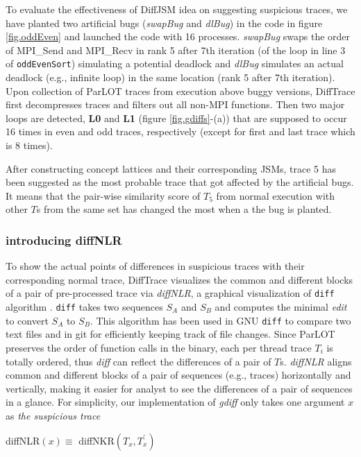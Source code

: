 To evaluate the effectiveness of DiffJSM idea on suggesting suspicious traces, we have planted two artificial bugs (\textit{swapBug} and \textit{dlBug}) in the code in figure \ref{fig.oddEven} and launched the code with 16 processes. 
%
\textit{swapBug} swaps the order of MPI\_Send and MPI\_Recv in rank 5 after 7th iteration (of the loop in line 3 of \texttt{oddEvenSort}) simulating a potential deadlock and \textit{dlBug} simulates an actual deadlock (e.g., infinite loop) in the same location (rank 5 after 7th iteration).
%
Upon collection of ParLOT traces from execution above buggy versions, DiffTrace first decompresses traces and filters out all non-MPI functions.
Then two major loops are detected, \textbf{L0} and \textbf{L1}  (figure \ref{fig.gdiffs}-(a)) that are supposed to occur 16 times in even and odd traces, respectively (except for first and last trace which is 8 times).

After constructing concept lattices and their corresponding JSMs, trace 5 has been suggested as the most probable trace that got affected by the artificial bugs. It means that the pair-wise similarity score of $T_5$ from normal execution with other $T$s from the same set has changed the most when a the bug is planted. 

\subsubsection{introducing diffNLR}
To show the actual points of differences in suspicious traces with their corresponding normal trace, DiffTrace visualizes the common and different blocks of a pair of pre-processed trace via \textit{diffNLR}, a graphical visualization of \texttt{diff} algorithm \cite{diff-myers}.
%
\texttt{diff} takes two sequences $S_A$ and $S_B$ and computes the minimal \textit{edit} to convert $S_A$ to $S_B$. This algorithm has been used in GNU \texttt{diff} to compare two text files and in git for efficiently keeping track of file changes.
Since ParLOT preserves the order of function calls in the binary, each per thread trace $T_i$ is totally ordered, thus \textit{diff} can reflect the differences of a pair of $T$s. \textit{diffNLR} aligns common and different blocks of a pair of sequences (e.g., traces) horizontally and vertically, making it easier for analyst to see the differences of a pair of sequences in a glance.  
For simplicity, our implementation of \textit{gdiff} only takes one argument $x$ as \textit{the suspicious trace}

diffNLR$(x) \equiv $ diffNKR$(T_x,T_x^\prime)$

